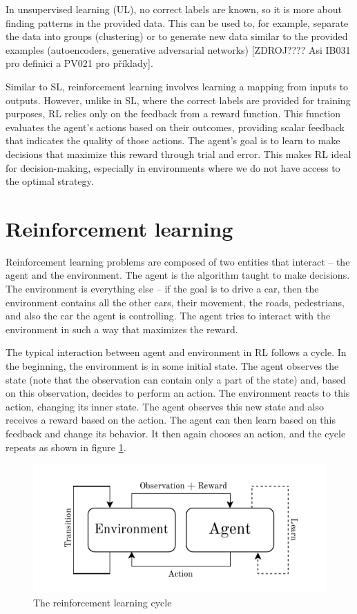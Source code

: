 \documentclass[
  digital,     %
  oneside,     %
  nosansbold,  %
  nocolorbold, %
  lof,         %
  lot,         %
]{fithesis4}
\begin{document}
In unsupervised learning (UL), no correct labels are known, so it is more about finding patterns in the provided data. This can be used to, for example, separate the data into groups (clustering) or to generate new data similar to the provided examples (autoencoders, generative adversarial networks) [ZDROJ???? Asi IB031 pro definici a PV021 pro příklady].

Similar to SL, reinforcement learning involves learning a mapping from inputs to outputs. However, unlike in SL, where the correct labels are provided for training purposes, RL relies only on the feedback from a reward function. This function evaluates the agent's actions based on their outcomes, providing scalar feedback that indicates the quality of those actions. The agent's goal is to learn to make decisions that maximize this reward through trial and error. This makes RL ideal for decision-making, especially in environments where we do not have access to the optimal strategy.

\section{Reinforcement learning}
Reinforcement learning problems are composed of two entities that interact -- the agent and the environment. The agent is the algorithm taught to make decisions. The environment is everything else -- if the goal is to drive a car, then the environment contains all the other cars, their movement, the roads, pedestrians, and also the car the agent is controlling. The agent tries to interact with the environment in such a way that maximizes the reward.

The typical interaction between agent and environment in RL follows a cycle. In the beginning, the environment is in some initial state. The agent observes the state (note that the observation can contain only a part of the state) and, based on this observation, decides to perform an action. The environment reacts to this action, changing its inner state. The agent observes this new state and also receives a reward based on the action. The agent can then learn based on this feedback and change its behavior. It then again chooses an action, and the cycle repeats as shown in figure \ref{fig:rl-cycle}.

\begin{figure}
    \centering
    \includegraphics[width=1\linewidth]{diagrams/rl_cycle.pdf}
    \caption{The reinforcement learning cycle}
    \label{fig:rl-cycle}
\end{figure}
\end{document}
